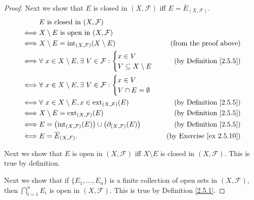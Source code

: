 \begin{proof}
    Next we show that \(E\) is closed in \((X, \mathcal{F})\) iff \(E = \overline{E}_{(X, \mathcal{F})}\).
    \begin{align*}
             & E \text{ is closed in } (X, \mathcal{F})                                                                                            \\
        \iff & X \setminus E \text{ is open in } (X, \mathcal{F})                                                                                  \\
        \iff & X \setminus E = \text{int}_{(X, \mathcal{F})}(X \setminus E)                                 & \text{(from the proof above)}        \\
        \iff & \forall\ x \in X \setminus E, \exists\ V \in \mathcal{F} : \begin{cases}
            x \in V \\
            V \subseteq X \setminus E
        \end{cases}        & \text{(by Definition \ref{2.5.5})}   \\
        \iff & \forall\ x \in X \setminus E, \exists\ V \in \mathcal{F} : \begin{cases}
            x \in V \\
            V \cap E = \emptyset
        \end{cases}                                               \\
        \iff & \forall\ x \in X \setminus E, x \in \text{ext}_{(X, \mathcal{F})}(E)                         & \text{(by Definition \ref{2.5.5})}   \\
        \iff & X \setminus E = \text{ext}_{(X, \mathcal{F})}(E)                                             & \text{(by Definition \ref{2.5.5})}   \\
        \iff & E = \big(\text{int}_{(X, \mathcal{F})}(E)\big) \cup \big(\partial_{(X, \mathcal{F})}(E)\big) & \text{(by Definition \ref{2.5.5})}   \\
        \iff & E = \overline{E}_{(X, \mathcal{F})}.                                                         & \text{(by Exercise \ref{ex 2.5.10})}
    \end{align*}

    Next we show that \(E\) is open in \((X, \mathcal{F})\) iff \(X \setminus E\) is closed in \((X, \mathcal{F})\).
    This is true by definition.

    Next we show that if \(\{E_1, \dots, E_n\}\) is a finite collection of open sets in \((X, \mathcal{F})\), then \(\bigcap_{i = 1}^n E_i\) is open in \((X, \mathcal{F})\).
    This is true by Definition \ref{2.5.1}.


\end{proof}
